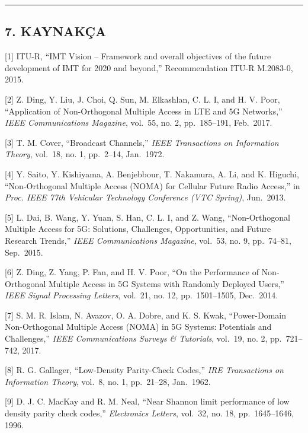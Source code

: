 \documentclass[
]{IEEEtran}
\begin{document}
\begin{center}\rule{0.5\linewidth}{0.5pt}\end{center}

\subsection{7. KAYNAKÇA}\label{kaynakuxe7a}

{[}1{]} ITU-R, ``IMT Vision -- Framework and overall objectives of the
future development of IMT for 2020 and beyond,'' Recommendation ITU-R
M.2083-0, 2015.

{[}2{]} Z. Ding, Y. Liu, J. Choi, Q. Sun, M. Elkashlan, C. L. I, and H.
V. Poor, ``Application of Non-Orthogonal Multiple Access in LTE and 5G
Networks,'' \emph{IEEE Communications Magazine}, vol.~55, no. 2,
pp.~185--191, Feb.~2017.

{[}3{]} T. M. Cover, ``Broadcast Channels,'' \emph{IEEE Transactions on
Information Theory}, vol.~18, no. 1, pp.~2--14, Jan.~1972.

{[}4{]} Y. Saito, Y. Kishiyama, A. Benjebbour, T. Nakamura, A. Li, and
K. Higuchi, ``Non-Orthogonal Multiple Access (NOMA) for Cellular Future
Radio Access,'' in \emph{Proc. IEEE 77th Vehicular Technology Conference
(VTC Spring)}, Jun.~2013.

{[}5{]} L. Dai, B. Wang, Y. Yuan, S. Han, C. L. I, and Z. Wang,
``Non-Orthogonal Multiple Access for 5G: Solutions, Challenges,
Opportunities, and Future Research Trends,'' \emph{IEEE Communications
Magazine}, vol.~53, no. 9, pp.~74--81, Sep.~2015.

{[}6{]} Z. Ding, Z. Yang, P. Fan, and H. V. Poor, ``On the Performance
of Non-Orthogonal Multiple Access in 5G Systems with Randomly Deployed
Users,'' \emph{IEEE Signal Processing Letters}, vol.~21, no. 12,
pp.~1501--1505, Dec.~2014.

{[}7{]} S. M. R. Islam, N. Avazov, O. A. Dobre, and K. S. Kwak,
``Power-Domain Non-Orthogonal Multiple Access (NOMA) in 5G Systems:
Potentials and Challenges,'' \emph{IEEE Communications Surveys \&
Tutorials}, vol.~19, no. 2, pp.~721--742, 2017.

{[}8{]} R. G. Gallager, ``Low-Density Parity-Check Codes,'' \emph{IRE
Transactions on Information Theory}, vol.~8, no. 1, pp.~21--28,
Jan.~1962.

{[}9{]} D. J. C. MacKay and R. M. Neal, ``Near Shannon limit performance
of low density parity check codes,'' \emph{Electronics Letters},
vol.~32, no. 18, pp.~1645--1646, 1996.
\end{document}
